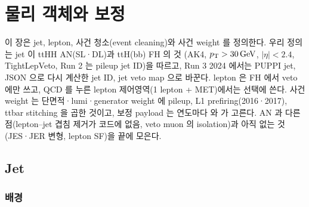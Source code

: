 \chapter{물리 객체와 보정}\label{ch:objects}

이 장은 jet, lepton, 사건 청소(event cleaning)와 사건 weight 를 정의한다. 우리 정의는 jet 이 ttHH AN(SL·DL)과 ttH(bb) FH 의 것
(AK4, $p_{\mathrm{T}}>30\,\mathrm{GeV}$, $|\eta|<2.4$, TightLepVeto, Run 2 는 pileup jet ID)을 따르고, Run 3 2024 에서는 PUPPI jet, JSON 으로 다시 계산한
jet ID, jet veto map 으로 바꾼다. lepton 은 FH 에서 veto 에만 쓰고, QCD 를 누른 lepton 제어영역(1 lepton + MET)에서는 선택에 쓴다.
사건 weight 는 단면적·lumi·generator weight 에 pileup, L1 prefiring(2016·2017), ttbar stitching 을 곱한 것이고, 보정 payload 는 연도마다
 와  가 고른다. AN 과 다른 점(lepton–jet 겹침 제거가 코드에 없음, veto muon 의
isolation)과 아직 없는 것(JES·JER 변형, lepton SF)을 끝에 모은다.

\section{Jet}\label{sec:objects-jets}

\subsection{배경}\label{sec:objects-jets-theory}


